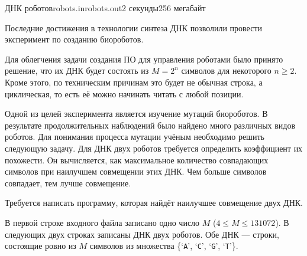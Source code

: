 \begin{problem}{ДНК роботов}{robots.in}{robots.out}{2 секунды}{256 мегабайт}



Последние достижения в технологии синтеза ДНК позволили
провести эксперимент по созданию биороботов.

Для облегчения задачи создания ПО для управления роботами
было принято решение, что их ДНК будет состоять из $M=2^n$ символов
для некоторого $n\ge 2$.
Кроме этого, по техническим причинам это будет не обычная строка,
а циклическая, то есть её можно начинать читать с любой позиции.

Одной из целей эксперимента является изучение мутаций биороботов.
В результате продолжительных наблюдений было найдено много различных
видов роботов.
Для понимания процесса мутации учёным необходимо решить следующую задачу.
Для ДНК двух роботов требуется определить коэффициент их похожести.
Он вычисляется, как максимальное количество совпадающих символов
при наилучшем совмещении этих ДНК.
Чем больше символов совпадает, тем лучше совмещение.

Требуется написать программу, которая найдёт наилучшее совмещение двух ДНК.

\InputFile

В первой строке входного файла записано одно число $M$ ($4\le M\le 131072$).
В следующих двух строках записаны ДНК двух роботов.
Обе ДНК --- строки, состоящие ровно из $M$ символов из множества
\{`\texttt{A}', `\texttt{C}', `\texttt{G}', `\texttt{T}'\}.


\end{problem}
